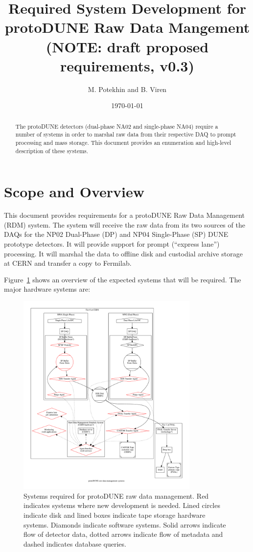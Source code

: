 \documentclass[pdftex,12pt,letter]{article}
\title{Required System Development for protoDUNE Raw Data Mangement\\
(NOTE: draft proposed requirements, v0.3)}
\date{\today}
\author{M. Potekhin and B. Viren}
\begin{document}
\maketitle

\begin{abstract}
  The protoDUNE detectors (dual-phase NA02 and single-phase NA04)
  require a number of systems in order to marshal raw data from
  their respective DAQ to prompt processing and mass storage.  This
  document provides an enumeration and high-level description of these
  systems.
\end{abstract}

\tableofcontents

\pagebreak

\section{Scope and Overview}

This document provides requirements for a protoDUNE Raw Data
Management (RDM) system.  The system will receive the raw data from
its two sources of the DAQs for the NP02 Dual-Phase (DP) and NP04
Single-Phase (SP) DUNE prototype detectors.  It will provide support
for prompt (``express lane'') processing.  It will marshal the data to
offline disk and custodial archive storage at CERN and transfer a copy
to Fermilab.  

Figure~\ref{fig:flow} shows an overview of the expected systems that
will be required.  The major hardware systems are:

\begin{figure}[h]
  \centering
  \includegraphics[width=0.8\textwidth]{flow.pdf}
  \caption{Systems required for protoDUNE raw data management.  Red indicates systems where new development is needed.  Lined circles indicate disk and lined boxes indicate tape storage hardware systems.  Diamonds indicate software systems.  Solid arrows indicate flow of detector data, dotted arrows indicate flow of metadata and dashed indicates database queries.}
  \label{fig:flow}
\end{figure}
\end{document}
